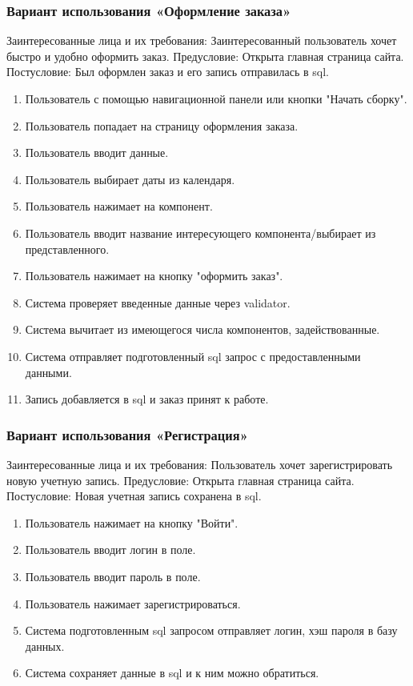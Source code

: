 \subsubsection{Вариант использования «Оформление заказа»}
Заинтересованные лица и их требования: Заинтересованный пользователь хочет быстро и удобно оформить заказ.
Предусловие: Открыта главная страница сайта.
Постусловие: Был оформлен заказ и его запись отправилась в sql.
\begin{enumerate}
	\item Пользователь с помощью навигационной панели или кнопки "Начать сборку".
	\item Пользователь попадает на страницу оформления заказа.
	\item Пользователь вводит данные.
	\item Пользователь выбирает даты из календаря.
	\item Пользователь нажимает на компонент.
	\item Пользователь вводит название интересующего компонента/выбирает из представленного.
	\item Пользователь нажимает на кнопку "оформить заказ".
	\item Система проверяет введенные данные через validator.
	\item Система вычитает из имеющегося числа компонентов, задействованные.
	\item Система отправляет подготовленный sql запрос с предоставленными данными.
	\item Запись добавляется в sql и заказ принят к работе.
\end{enumerate}

\subsubsection{Вариант использования «Регистрация»}
Заинтересованные лица и их требования: Пользователь хочет зарегистрировать новую учетную запись.
Предусловие: Открыта главная страница сайта.
Постусловие: Новая учетная запись сохранена в sql.
\begin{enumerate}
	\item Пользователь нажимает на кнопку "Войти".
	\item Пользователь вводит логин в поле.
	\item Пользователь вводит пароль в поле.
	\item Пользователь нажимает зарегистрироваться.
	\item Система подготовленным sql запросом отправляет логин, хэш пароля в базу данных.
	\item Система сохраняет данные в sql и к ним можно обратиться.
\end{enumerate}

